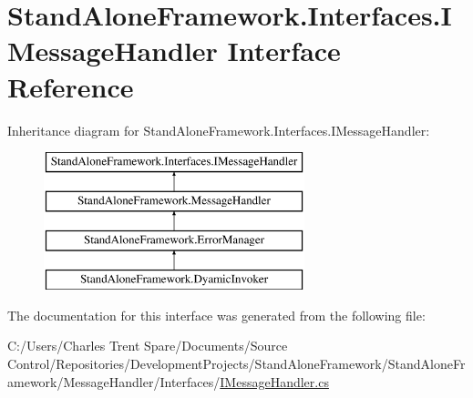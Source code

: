 \hypertarget{interface_stand_alone_framework_1_1_interfaces_1_1_i_message_handler}{\section{Stand\+Alone\+Framework.\+Interfaces.\+I\+Message\+Handler Interface Reference}
\label{interface_stand_alone_framework_1_1_interfaces_1_1_i_message_handler}
}
Inheritance diagram for Stand\+Alone\+Framework.\+Interfaces.\+I\+Message\+Handler\+:\begin{figure}[H]
\begin{center}
\leavevmode
\includegraphics[height=4.000000cm]{interface_stand_alone_framework_1_1_interfaces_1_1_i_message_handler}
\end{center}
\end{figure}


The documentation for this interface was generated from the following file\+:\begin{DoxyCompactItemize}
\item 
C\+:/\+Users/\+Charles Trent Spare/\+Documents/\+Source Control/\+Repositories/\+Development\+Projects/\+Stand\+Alone\+Framework/\+Stand\+Alone\+Framework/\+Message\+Handler/\+Interfaces/\hyperlink{_i_message_handler_8cs}{I\+Message\+Handler.\+cs}\end{DoxyCompactItemize}
